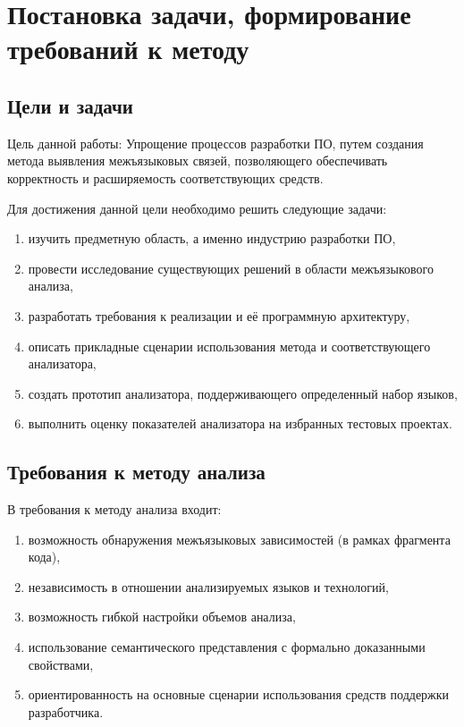 \chapter{Постановка задачи, формирование требований к методу}

\section{Цели и задачи}

Цель данной работы: Упрощение процессов разработки ПО, путем создания метода выявления межъязыковых связей,
позволяющего обеспечивать корректность и расширяемость соответствующих средств.

Для достижения данной цели необходимо решить следующие задачи:
\begin{enumerate}[1)]
    \item изучить предметную область, а именно индустрию разработки ПО,
    \item провести исследование существующих решений в области межъязыкового анализа,
    \item разработать требования к реализации и её программную архитектуру,
    \item описать прикладные сценарии использования метода и соответствующего анализатора,
    \item создать прототип анализатора, поддерживающего определенный набор языков,
    \item выполнить оценку показателей анализатора на избранных тестовых проектах.
\end{enumerate}


\section{Требования к методу анализа}

В требования к методу анализа входит:
\begin{enumerate}[1)]
    \item возможность обнаружения межъязыковых зависимостей (в рамках фрагмента кода),
    \item независимость в отношении анализируемых языков и технологий,
    \item возможность гибкой настройки объемов анализа,
    \item использование семантического представления с формально доказанными свойствами,
    \item ориентированность на основные сценарии использования средств
    поддержки разработчика. 
\end{enumerate}

\clearpage